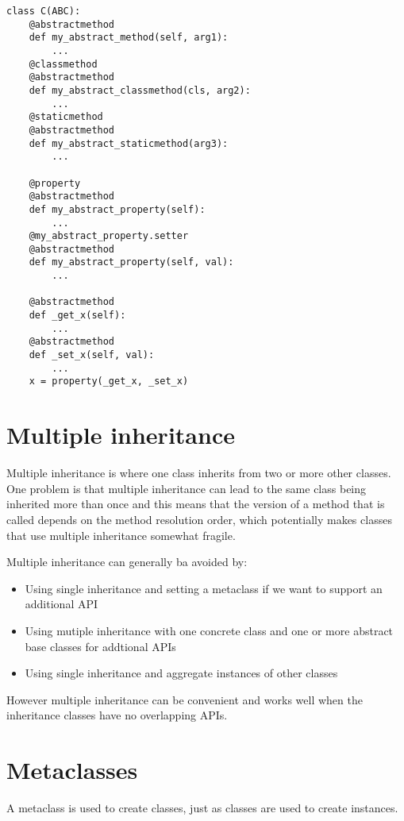 \begin{lstlisting}
class C(ABC):
    @abstractmethod
    def my_abstract_method(self, arg1):
        ...
    @classmethod
    @abstractmethod
    def my_abstract_classmethod(cls, arg2):
        ...
    @staticmethod
    @abstractmethod
    def my_abstract_staticmethod(arg3):
        ...

    @property
    @abstractmethod
    def my_abstract_property(self):
        ...
    @my_abstract_property.setter
    @abstractmethod
    def my_abstract_property(self, val):
        ...

    @abstractmethod
    def _get_x(self):
        ...
    @abstractmethod
    def _set_x(self, val):
        ...
    x = property(_get_x, _set_x)
\end{lstlisting}


\section{Multiple inheritance}
\label{sec:multiple-inheritance}


Multiple inheritance is where one class inherits from two or more other classes.
One problem is that multiple inheritance can lead to the same class being inherited more than once and this means that the version of a method that is called depends on the method resolution order, which potentially makes classes that use multiple inheritance somewhat fragile.



Multiple inheritance can generally ba avoided by:
\begin{itemize}
\item Using single inheritance and setting a metaclass if we want to support an additional API
\item Using mutiple inheritance with one concrete class and one or more abstract base classes for addtional APIs
\item Using single inheritance and aggregate instances of other classes
\end{itemize}

However multiple inheritance can be convenient and works well when the inheritance classes have no overlapping APIs.


\section{Metaclasses}
\label{sec:metaclasses}

A metaclass is used to create classes, just as classes are used to create instances.

